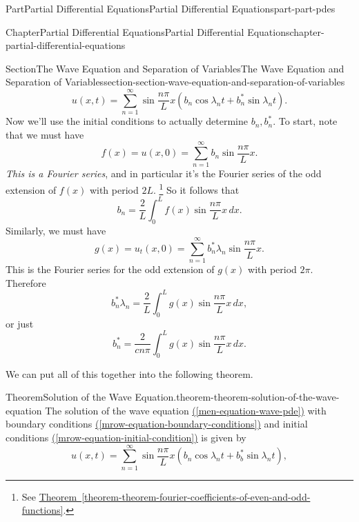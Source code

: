 \documentclass[twoside,10pt,]{book}
\newcommand{\xreffont}{\relax}
\numberwithin{equation}{part}
\begin{document}
\begin{partptx}{Part}{Partial Differential Equations}{}{Partial Differential Equations}{}{}{part-part-pdes}
\begin{chapterptx}{Chapter}{Partial Differential Equations}{}{Partial Differential Equations}{}{}{chapter-partial-differential-equations}
\begin{sectionptx}{Section}{The Wave Equation and Separation of Variables}{}{The Wave Equation and Separation of Variables}{}{}{section-section-wave-equation-and-separation-of-variables}
%
\begin{equation*}
u(x,t) = \sum_{n=1}^{\infty}\sin\frac{n\pi}{L}x\left(b_{n}\cos\lambda_{n}t+b^{*}_{n}\sin\lambda_{n}t\right).
\end{equation*}
Now we'll use the initial conditions to actually determine \(b_{n},b^{*}_{n}\). To start, note that we must have%
\begin{equation*}
f(x) = u(x,0) = \sum_{n=1}^{\infty}b_{n}\sin\frac{n\pi}{L}x.
\end{equation*}
\emph{This is a Fourier series}, and in particular it's the Fourier series of the odd extension of \(f(x)\) with period \(2L\). \footnote{See \hyperref[theorem-theorem-fourier-coefficients-of-even-and-odd-functions]{Theorem~{\xreffont\ref{theorem-theorem-fourier-coefficients-of-even-and-odd-functions}}}.\label{fn-section-wave-equation-and-separation-of-variables-u-f}} So it follows that%
%
\begin{equation*}
b_{n} = \frac{2}{L}\int_{0}^{L}f(x)\sin\frac{n\pi}{L}x\,dx.
\end{equation*}
Similarly, we must have%
\begin{equation*}
g(x) = u_{t}(x,0) = \sum_{n=1}^{\infty}b_{n}^{*}\lambda_{n}\sin\frac{n\pi}{L}x.
\end{equation*}
This is the Fourier series for the odd extension of \(g(x)\) with period \(2\pi\). Therefore%
\begin{equation*}
b^{*}_{n}\lambda_{n} = \frac{2}{L}\int_{0}^{L}g(x)\sin\frac{n\pi}{L}x\,dx,
\end{equation*}
or just%
\begin{equation*}
b^{*}_{n} = \frac{2}{cn\pi}\int_{0}^{L}g(x)\sin\frac{n\pi}{L}x\,dx.
\end{equation*}
%
\par
We can put all of this together into the following theorem.%
\begin{theorem}{Theorem}{Solution of the Wave Equation.}{}{theorem-theorem-solution-of-the-wave-equation}%
%
The solution of the wave equation \hyperref[men-equation-wave-pde]{({\xreffont\ref{men-equation-wave-pde}})} with boundary conditions \hyperref[mrow-equation-boundary-conditions]{({\xreffont\ref{mrow-equation-boundary-conditions}})} and initial conditions \hyperref[mrow-equation-initial-condition]{({\xreffont\ref{mrow-equation-initial-condition}})} is given by%
\begin{equation*}
u(x,t) = \sum_{n=1}^{\infty}\sin\frac{n\pi}{L}x(b_{n}\cos\lambda_{n}t+b^{*}_{b}\sin\lambda_{n}t),
\end{equation*}

\end{theorem}
\end{sectionptx}
\end{chapterptx}
\end{partptx}
\end{document}
